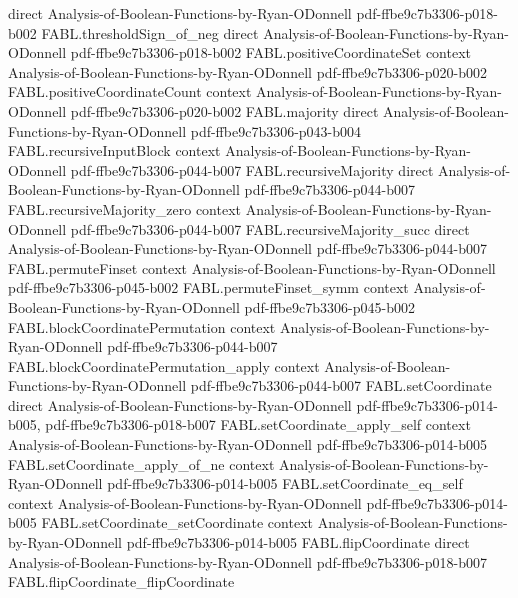 \begin{theorem}
  {direct}
  {Analysis-of-Boolean-Functions-by-Ryan-ODonnell}
  {pdf-ffbe9c7b3306-p018-b002}
\proofstep
  {FABL.thresholdSign_of_neg}
  {direct}
  {Analysis-of-Boolean-Functions-by-Ryan-ODonnell}
  {pdf-ffbe9c7b3306-p018-b002}
\proofstep
  {FABL.positiveCoordinateSet}
  {context}
  {Analysis-of-Boolean-Functions-by-Ryan-ODonnell}
  {pdf-ffbe9c7b3306-p020-b002}
\proofstep
  {FABL.positiveCoordinateCount}
  {context}
  {Analysis-of-Boolean-Functions-by-Ryan-ODonnell}
  {pdf-ffbe9c7b3306-p020-b002}
\proofstep
  {FABL.majority}
  {direct}
  {Analysis-of-Boolean-Functions-by-Ryan-ODonnell}
  {pdf-ffbe9c7b3306-p043-b004}
\proofstep
  {FABL.recursiveInputBlock}
  {context}
  {Analysis-of-Boolean-Functions-by-Ryan-ODonnell}
  {pdf-ffbe9c7b3306-p044-b007}
\proofstep
  {FABL.recursiveMajority}
  {direct}
  {Analysis-of-Boolean-Functions-by-Ryan-ODonnell}
  {pdf-ffbe9c7b3306-p044-b007}
\proofstep
  {FABL.recursiveMajority_zero}
  {context}
  {Analysis-of-Boolean-Functions-by-Ryan-ODonnell}
  {pdf-ffbe9c7b3306-p044-b007}
\proofstep
  {FABL.recursiveMajority_succ}
  {direct}
  {Analysis-of-Boolean-Functions-by-Ryan-ODonnell}
  {pdf-ffbe9c7b3306-p044-b007}
\proofstep
  {FABL.permuteFinset}
  {context}
  {Analysis-of-Boolean-Functions-by-Ryan-ODonnell}
  {pdf-ffbe9c7b3306-p045-b002}
\proofstep
  {FABL.permuteFinset_symm}
  {context}
  {Analysis-of-Boolean-Functions-by-Ryan-ODonnell}
  {pdf-ffbe9c7b3306-p045-b002}
\proofstep
  {FABL.blockCoordinatePermutation}
  {context}
  {Analysis-of-Boolean-Functions-by-Ryan-ODonnell}
  {pdf-ffbe9c7b3306-p044-b007}
\proofstep
  {FABL.blockCoordinatePermutation_apply}
  {context}
  {Analysis-of-Boolean-Functions-by-Ryan-ODonnell}
  {pdf-ffbe9c7b3306-p044-b007}
\proofstep
  {FABL.setCoordinate}
  {direct}
  {Analysis-of-Boolean-Functions-by-Ryan-ODonnell}
  {pdf-ffbe9c7b3306-p014-b005,
    pdf-ffbe9c7b3306-p018-b007}
\proofstep
  {FABL.setCoordinate_apply_self}
  {context}
  {Analysis-of-Boolean-Functions-by-Ryan-ODonnell}
  {pdf-ffbe9c7b3306-p014-b005}
\proofstep
  {FABL.setCoordinate_apply_of_ne}
  {context}
  {Analysis-of-Boolean-Functions-by-Ryan-ODonnell}
  {pdf-ffbe9c7b3306-p014-b005}
\proofstep
  {FABL.setCoordinate_eq_self}
  {context}
  {Analysis-of-Boolean-Functions-by-Ryan-ODonnell}
  {pdf-ffbe9c7b3306-p014-b005}
\proofstep
  {FABL.setCoordinate_setCoordinate}
  {context}
  {Analysis-of-Boolean-Functions-by-Ryan-ODonnell}
  {pdf-ffbe9c7b3306-p014-b005}
\proofstep
  {FABL.flipCoordinate}
  {direct}
  {Analysis-of-Boolean-Functions-by-Ryan-ODonnell}
  {pdf-ffbe9c7b3306-p018-b007}
\proofstep
  {FABL.flipCoordinate_flipCoordinate}

\end{theorem}
